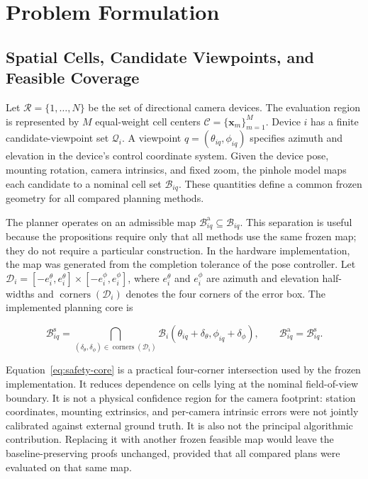 \section{Problem Formulation}\label{sec:problem}

\subsection{Spatial Cells, Candidate Viewpoints, and Feasible Coverage}

Let $\mathcal R=\{1,\ldots,N\}$ be the set of directional camera devices. The evaluation region is represented by $M$ equal-weight cell centers $\mathcal C=\{\mathbf x_m\}_{m=1}^{M}$. Device $i$ has a finite candidate-viewpoint set $\mathcal Q_i$. A viewpoint $q=(\theta_{iq},\phi_{iq})$ specifies azimuth and elevation in the device's control coordinate system. Given the device pose, mounting rotation, camera intrinsics, and fixed zoom, the pinhole model maps each candidate to a nominal cell set $\mathcal B_{iq}$. These quantities define a common frozen geometry for all compared planning methods.

The planner operates on an admissible map $\mathcal B^{\mathrm a}_{iq}\subseteq\mathcal B_{iq}$. This separation is useful because the propositions require only that all methods use the same frozen map; they do not require a particular construction. In the hardware implementation, the map was generated from the completion tolerance of the pose controller. Let
$\mathcal D_i=[-e_i^\theta,e_i^\theta]\times[-e_i^\phi,e_i^\phi]$, where $e_i^\theta$ and $e_i^\phi$ are azimuth and elevation half-widths and $\operatorname{corners}(\mathcal D_i)$ denotes the four corners of the error box. The implemented planning core is

\begin{equation}\label{eq:safety-core}
\mathcal B^{\mathrm s}_{iq}=
\bigcap_{(\delta_\theta,\delta_\phi)\in\operatorname{corners}(\mathcal D_i)}
\mathcal B_i(\theta_{iq}+\delta_\theta,\phi_{iq}+\delta_\phi),
\qquad \mathcal B^{\mathrm a}_{iq}=\mathcal B^{\mathrm s}_{iq}.
\end{equation}

Equation~\eqref{eq:safety-core} is a practical four-corner intersection used by the frozen implementation. It reduces dependence on cells lying at the nominal field-of-view boundary. It is not a physical confidence region for the camera footprint: station coordinates, mounting extrinsics, and per-camera intrinsic errors were not jointly calibrated against external ground truth. It is also not the principal algorithmic contribution. Replacing it with another frozen feasible map would leave the baseline-preserving proofs unchanged, provided that all compared plans were evaluated on that same map.

